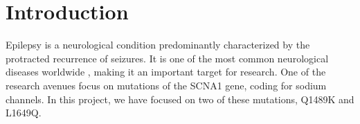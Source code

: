 \section{Introduction}

Epilepsy is a neurological condition predominantly characterized by the protracted recurrence of
seizures.
It is one of the most common neurological diseases worldwide ,
making it an important target for research. One of the research avenues focus on mutations of the
SCNA1 gene, coding for sodium channels. In this project, we have focused on two of these mutations,
Q1489K and L1649Q.





